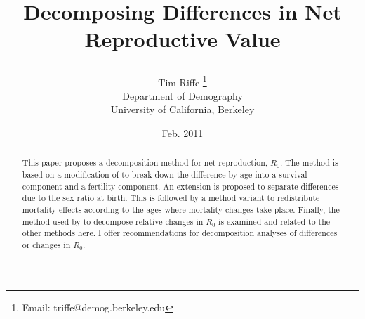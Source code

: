 \documentclass{article}
\begin{document}
\title{\textbf{Decomposing Differences in Net Reproductive Value}
\author{Tim Riffe \footnote{Email: triffe@demog.berkeley.edu}\\
Department of Demography\\ 
University of California, Berkeley \\
}
\date{Feb. 2011}
}
\maketitle

\begin{abstract}
This paper proposes a decomposition method for net reproduction, $R_{0}$. The method is based on a modification
of \citet{kltagawa1955components} to break down the difference by age into a
survival component and a fertility component. An extension is proposed to separate differences due to the sex ratio at birth. This is followed by a method variant to redistribute mortality effects according to the ages where mortality changes take place. Finally, the method used by \citet{lillova2008r0decomp} to decompose relative changes in $R_{0}$ is examined and related to the other methods here. I offer recommendations for decomposition analyses of differences or changes in $R_{0}$.
\end{abstract}


\pagebreak

\end{document}
